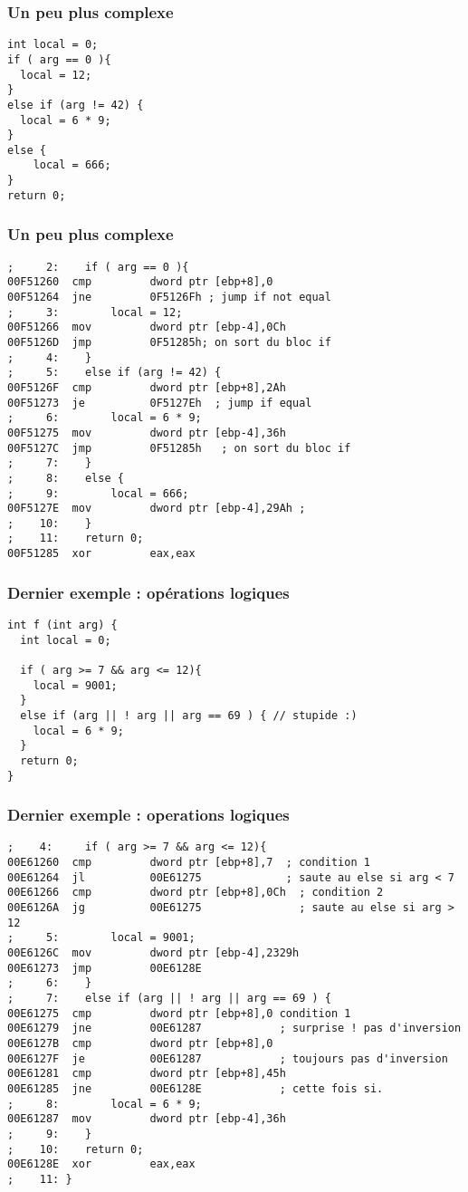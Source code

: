 \documentclass{beamer}
\begin{document}
\begin{frame}[fragile]
\frametitle{Un peu plus complexe}
\begin{lstlisting}
int local = 0;
if ( arg == 0 ){
  local = 12;
}
else if (arg != 42) {
  local = 6 * 9;
}
else {
	local = 666;
}
return 0;
\end{lstlisting}
\end{frame}

\begin{frame}[fragile]
\frametitle{Un peu plus complexe}
\begin{lstlisting}[language={[x86masm]Assembler}, basicstyle={\scriptsize\ttfamily}]
;     2: 	if ( arg == 0 ){
00F51260  cmp         dword ptr [ebp+8],0  
00F51264  jne         0F5126Fh ; jump if not equal 
;     3: 		local = 12;
00F51266  mov         dword ptr [ebp-4],0Ch  
00F5126D  jmp         0F51285h; on sort du bloc if 
;     4: 	}
;     5: 	else if (arg != 42) {
00F5126F  cmp         dword ptr [ebp+8],2Ah  
00F51273  je          0F5127Eh  ; jump if equal
;     6: 		local = 6 * 9;
00F51275  mov         dword ptr [ebp-4],36h  
00F5127C  jmp         0F51285h   ; on sort du bloc if
;     7: 	}
;     8: 	else {
;     9: 		local = 666;
00F5127E  mov         dword ptr [ebp-4],29Ah ; 
;    10: 	}
;    11: 	return 0;
00F51285  xor         eax,eax  
\end{lstlisting}
\end{frame}

\begin{frame}[fragile]
\frametitle{Dernier exemple : opérations logiques}
\begin{lstlisting}
int f (int arg) {
  int local = 0;

  if ( arg >= 7 && arg <= 12){
    local = 9001;
  }
  else if (arg || ! arg || arg == 69 ) { // stupide :)
    local = 6 * 9;
  }
  return 0;
}
\end{lstlisting}
\end{frame}

\begin{frame}[fragile]
\frametitle{Dernier exemple : operations logiques}
\begin{lstlisting}[language={[x86masm]Assembler}, basicstyle={\scriptsize\ttfamily}]
;    4: 	if ( arg >= 7 && arg <= 12){
00E61260  cmp         dword ptr [ebp+8],7  ; condition 1
00E61264  jl          00E61275             ; saute au else si arg < 7
00E61266  cmp         dword ptr [ebp+8],0Ch  ; condition 2 
00E6126A  jg          00E61275               ; saute au else si arg > 12
;     5: 		local = 9001;
00E6126C  mov         dword ptr [ebp-4],2329h  
00E61273  jmp         00E6128E  
;     6: 	}
;     7: 	else if (arg || ! arg || arg == 69 ) {
00E61275  cmp         dword ptr [ebp+8],0 condition 1 
00E61279  jne         00E61287            ; surprise ! pas d'inversion
00E6127B  cmp         dword ptr [ebp+8],0  
00E6127F  je          00E61287            ; toujours pas d'inversion
00E61281  cmp         dword ptr [ebp+8],45h  
00E61285  jne         00E6128E            ; cette fois si.
;     8: 		local = 6 * 9;
00E61287  mov         dword ptr [ebp-4],36h  
;     9: 	}
;    10: 	return 0;
00E6128E  xor         eax,eax  
;    11: }
\end{lstlisting}
\end{frame}
\end{document}

